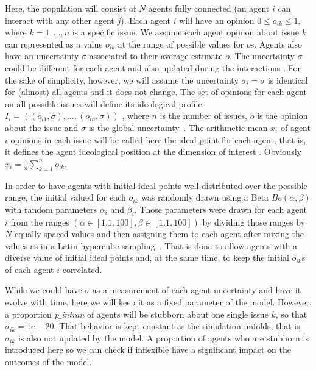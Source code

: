 \documentclass{article}
\begin{document}
Here, the population will consist of  \(N\) agents fully connected (an agent $i$ can interact with any other agent $j$). Each agent $i$ will have an opinion $0\leq o_{ik} \leq 1$, where $k=1, \ldots, n$ is a specific issue. We assume each agent opinion about issue $k$ can represented as a value $o_{ik}$ at the range of possible values for $o$s. Agents also have an uncertainty $\sigma$ associated to their average estimate $o$. The uncertainty $\sigma$ could be different for each agent and also updated during the interactions \cite{martins08c}. For the sake of simplicity, however, we will assume the uncertainty $\sigma_i =\sigma$ is identical for (almost) all agents and it does not change. The set of opinions for each agent on all possible issues will define its ideological profile
\(I_i
=
(
(o_{i 1}, \sigma),
\ldots,
(o_{i n}, \sigma)
)
\)
, where \(n\) is the number of issues, \(o\) is
the opinion about the issue and \(\sigma\) is the global  uncertainty~\cite{martins12b}. The arithmetic mean  $x_i$  of agent $i$ opinions in each issue will be called here the ideal point for each agent, that is, it defines the agent ideological position at the
dimension of interest \cite{armstrong2014analyzing}. Obviously
\(
x_i
=
\frac{1}{n}
\sum_{k=1}^{n}
o_{ik}
\).

In order to have agents with initial ideal points well distributed over the
possible range, the initial valued for each \(o_{ik}\) was randomly drawn
using a Beta \(Be(\alpha, \beta)\) with random parameters $\alpha_i$ and
$\beta_i$. Those parameters were drawn for each agent $i$ from the ranges \( (
\alpha \in [1.1, 100], \beta \in [1.1, 100] ) \) by dividing those ranges by
\(N\) equally spaced values and then assigning them to each agent after mixing
the values as in a Latin hypercube sampling~\cite{mckay2000comparison}. That is done to
allow agents with a diverse value of initial ideal points and, at the same time,
to keep the initial \(o_{ik}\)s of each agent $i$ correlated.


While we could have \(\sigma\) as a measurement of each agent uncertainty and
have it evolve with time, here we will keep it as a fixed parameter of the
model. However, a proportion \textit{p$\_$intran} of agents will be stubborn
about one single issue $k$, so that \(\sigma_{ik} = 1e-20\). That behavior is
kept constant as the simulation unfolds, that is $\sigma_{ik}$ is also not
updated by the model. A proportion of agents who are stubborn is introduced here
so we can check if inflexible \cite{galam05b,deffuant2002can,martinsgalam13a}
have a significant impact on the outcomes of the model.
\end{document}
